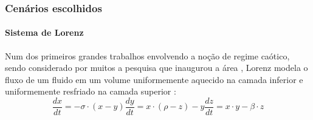 \documentclass{beamer}
\begin{document}
\begin{frame}
	\frametitle{Cenários escolhidos}
	\framesubtitle{Sistema de Lorenz}
\justifying Num dos primeiros grandes trabalhos envolvendo a noção de regime caótico, sendo considerado por muitos a pesquisa que inaugurou a área \cite{gleick1998chaos}, Lorenz modela o fluxo de um fluido em um volume uniformemente aquecido na camada inferior e uniformemente resfriado na camada superior \cite{lorenz1963deterministic}:
\begin{subequations}
\begin{equation}
\frac{dx}{dt} = -\sigma \cdot (x - y)
\end{equation}
\begin{equation}
\frac{dy}{dt} = x \cdot (\rho - z) - y
\end{equation}
\begin{equation}
\frac{dz}{dt} = x \cdot y - \beta \cdot z
\end{equation}
\end{subequations}
\end{frame}
\end{document}
